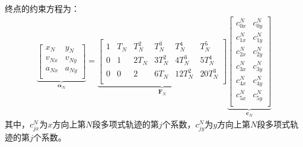 \documentclass[master,academic]{ysuthesis} %
\begin{document}
		终点的约束方程为：
		\begin{equation}
			\begin{aligned}
			\underbrace{\begin{bmatrix}
				x_N&		y_N\\
				v_{Nx}&		v_{Ny}\\
				a_{Nx}&		a_{Ny}\\
			\end{bmatrix}}_{\bm{\alpha}_N} =
			\underbrace{\begin{bmatrix}
				1&		T_N&		T_N^2&		T_N^3&		T_N^4&    	T_N^5\\
				0&		1&		2T_N&		3T_N^2&		4T_N^3&		5T_N^4\\
				0&		0&		2&		6T_N&		12T_N^2&		20T_N^3\\
			\end{bmatrix}}_{\bm{F}_N} 
			\underbrace{\begin{bmatrix}
				c_{0x}^{N}&		c_{0y}^{N}\\
				c_{1x}^{N}&		c_{1y}^{N}\\
				c_{2x}^{N}&		c_{2y}^{N}\\
				c_{3x}^{N}&		c_{3y}^{N}\\
				c_{4x}^{N}&		c_{4y}^{N}\\
				c_{5x}^{N}&		c_{5y}^{N}\\
			\end{bmatrix}}_{\bm{c}_N} 
			\end{aligned}
		\end{equation}
		其中，$c^N_{jx}$为$x$方向上第$N$段多项式轨迹的第$j$个系数，$c^N_{jy}$为$y$方向上第$N$段多项式轨迹的第$j$个系数。
		
\end{document}
